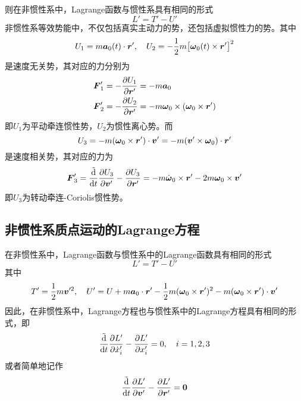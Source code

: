 则在非惯性系中，Lagrange函数与惯性系具有相同的形式
\begin{equation*}
	L' = T' - U'
\end{equation*}
非惯性系等效势能中，不仅包括真实主动力的势，还包括虚拟惯性力的势。其中
\begin{equation*}
	U_1 = m\boldsymbol{a}_0(t) \cdot \boldsymbol{r}',\quad U_2 = -\frac12 m\big[\boldsymbol{\omega}_0(t) \times \boldsymbol{r}'\big]^2
\end{equation*}
是速度无关势，其对应的力分别为
\begin{align*}
	\boldsymbol{F}'_1 & = -\frac{\partial U_1}{\partial \boldsymbol{r}'} = -m\boldsymbol{a}_0 \\
	\boldsymbol{F}'_2 & = -\frac{\partial U_2}{\partial \boldsymbol{r}'} = -m\boldsymbol{\omega}_0 \times (\boldsymbol{\omega}_0 \times \boldsymbol{r}')
\end{align*}
即$U_1$为{\heiti 平动牵连惯性势}，$U_2$为{\heiti 惯性离心势}。而
\begin{equation*}
	U_3 = -m(\boldsymbol{\omega}_0 \times \boldsymbol{r}') \cdot \boldsymbol{v}' = -m(\boldsymbol{v}' \times \boldsymbol{\omega}_0) \cdot \boldsymbol{r}'
\end{equation*}
是速度相关势，其对应的力为
\begin{equation*}
	\boldsymbol{F}'_3 = \frac{\tilde{\mathrm{d}}}{\mathrm{d} t} \frac{\partial U_3}{\partial \boldsymbol{v}'} - \frac{\partial U_3}{\partial \boldsymbol{r}'} = -m\dot{\boldsymbol{\omega}}_0 \times \boldsymbol{r}' - 2m\boldsymbol{\omega}_0 \times \boldsymbol{v}'
\end{equation*}
即$U_3$为{\heiti 转动牵连-Coriolis惯性势}。

\subsection{非惯性系质点运动的Lagrange方程}

在非惯性系中，Lagrange函数与惯性系中的Lagrange函数具有相同的形式
\begin{equation*}
	L' = T'-U'
\end{equation*}
其中
\begin{equation*}
	T' = \frac12 m\boldsymbol{v}'^2,\quad U' = U+m\boldsymbol{a}_0 \cdot \boldsymbol{r}' - \frac12 m (\boldsymbol{\omega}_0 \times \boldsymbol{r}')^2 - m(\boldsymbol{\omega}_0 \times \boldsymbol{r}') \cdot \boldsymbol{v}'
\end{equation*}
因此，在非惯性系中，Lagrange方程也与惯性系中的Lagrange方程具有相同的形式，即
\begin{equation}
	\frac{\tilde{\mathrm{d}}}{\mathrm{d} t} \frac{\partial L'}{\partial \dot{x}'_i} - \frac{\partial L'}{\partial x'_i} = 0,\quad i=1,2,3
\end{equation}
或者简单地记作
\begin{equation}
	\frac{\tilde{\mathrm{d}}}{\mathrm{d} t} \frac{\partial L'}{\partial \boldsymbol{v}'} - \frac{\partial L'}{\partial \boldsymbol{r}'} = \boldsymbol{0}
\end{equation}

